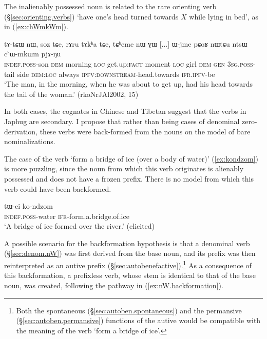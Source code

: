 The inalienably possessed noun  is related to the rare orienting verb (§\ref{sec:orienting.verbs})  `have one's head turned towards $X$ while lying in bed', as in (\ref{ex:chWmkWm}).

\begin{exe}
\ex \label{ex:chWmkWm}
\gll  tɤ-tɕɯ nɯ, soz tɕe, rɤru tɤkʰa tɕe, tɕʰeme nɯ ɣɯ [...] ɯ-jme pɕoʁ nɯtɕu ntsɯ cʰɯ-mkɯm pjɤ-ŋu \\
\textsc{indef}.\textsc{poss}-son \textsc{dem} morning \textsc{loc} get.up:\textsc{fact} moment \textsc{loc} girl \textsc{dem} \textsc{gen} {  } \textsc{3sg}.\textsc{poss}-tail side \textsc{dem}:\textsc{loc} always \textsc{ipfv}:\textsc{downstream}-head.towards \textsc{ifr}.\textsc{ipfv}-be \\
\glt `The man, in the morning, when he was about to get up, had his head towards the tail of the woman.' (rkoNrJAl2002, 15)
\end{exe}

In both cases, the cognates in Chinese and Tibetan suggest that the verbs in Japhug are secondary. I propose that rather than being cases of denominal zero-derivation, these verbs were back-formed from the nouns on the model of bare nominalizations.

The case of the verb  `form a bridge of ice (over a body of water)' (\ref{ex:kondzom}) is more puzzling, since the noun  from which this verb originates is alienably possessed and does not have a frozen  prefix. There is no model from which this verb could have been backformed. 

\begin{exe}
\ex \label{ex:kondzom}
\gll  tɯ-ci ko-ndzom \\
\textsc{indef}.\textsc{poss}-water \textsc{ifr}-form.a.bridge.of.ice \\
\glt `A bridge of ice formed over the river.' (elicited)
\end{exe}

A possible scenario for the backformation hypothesis is that a  denominal verb (§\ref{sec:denom.nW}) was first derived from the base noun, and its  prefix was then reinterpreted as an autive prefix (§\ref{sec:autobenefactive}).\footnote{Both the spontaneous (§\ref{sec:autoben.spontaneous}) and the permansive (§\ref{sec:autoben.permansive}) functions of the autive would be compatible with the meaning of the verb  `form a bridge of ice'.} As a consequence of this backformation, a prefixless verb, whose stem is identical to that of the base noun, was created, following the pathway in (\ref{ex:nW.backformation}).

